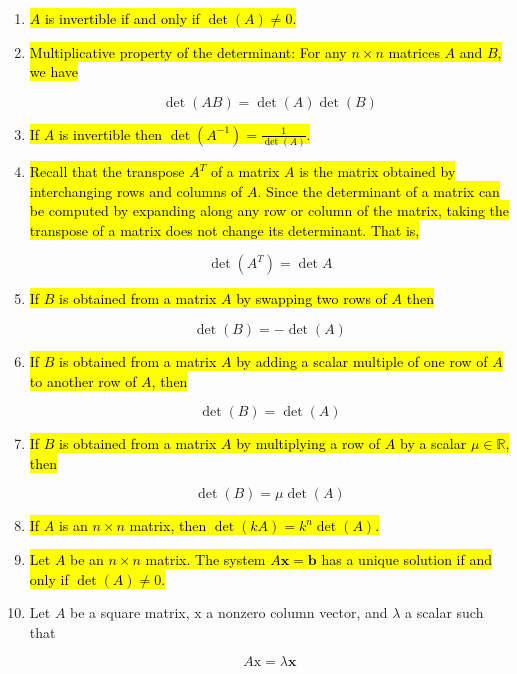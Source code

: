 \documentclass[10pt]{article}
\begin{document}
\begin{enumerate}
\item \hl{$A$ is invertible if and only if $\operatorname{det}(A) \neq 0$.}

\item \hl{Multiplicative property of the determinant: For any $n \times n$ matrices $A$ and $B$, we have}

$$
\operatorname{det}(A B)=\operatorname{det}(A) \operatorname{det}(B)
$$

\item \hl{If $A$ is invertible then $\operatorname{det}\left(A^{-1}\right)=\frac{1}{\operatorname{det}(A)}$.}

\item \hl{Recall that the transpose $A^{T}$ of a matrix $A$ is the matrix obtained by interchanging rows and columns of $A$. Since the determinant of a matrix can be computed by expanding along any row or column of the matrix, taking the transpose of a matrix does not change its determinant. That is,}

$$
\operatorname{det}\left(A^{T}\right)=\operatorname{det} A
$$

\item \hl{If $B$ is obtained from a matrix $A$ by swapping two rows of $A$ then}

$$
\operatorname{det}(B)=-\operatorname{det}(A)
$$

\item \hl{If $B$ is obtained from a matrix $A$ by adding a scalar multiple of one row of $A$ to another row of $A$, then}

$$
\operatorname{det}(B)=\operatorname{det}(A)
$$

\item \hl{If $B$ is obtained from a matrix $A$ by multiplying a row of $A$ by a scalar $\mu \in \mathbb{R}$, then}

$$
\operatorname{det}(B)=\mu \operatorname{det}(A)
$$

\item \hl{If $A$ is an $n \times n$ matrix, then $\operatorname{det}(k A)=k^{n} \operatorname{det}(A)$.}

\item \hl{Let $A$ be an $n \times n$ matrix. The system $A \mathbf{x}=\mathbf{b}$ has a unique solution if and only if $\operatorname{det}(A) \neq 0$.}

\item Let $A$ be a square matrix, $\mathrm{x}$ a nonzero column vector, and $\lambda$ a scalar such that

$$
A \mathrm{x}=\lambda \mathbf{x}
$$


\end{enumerate}
\end{document}
